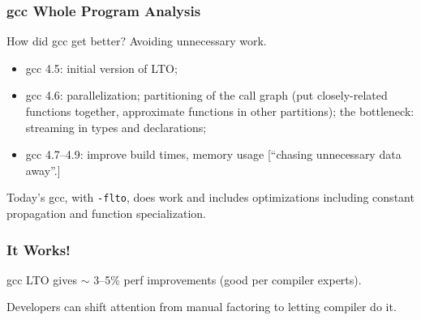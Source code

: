 \begin{frame}
\frametitle{gcc Whole Program Analysis}

{\Large How did gcc get better?  Avoiding unnecessary work. }

\begin{itemize}
\item gcc 4.5: initial version of LTO;
\item gcc 4.6: parallelization; partitioning of the call graph (put closely-related functions together, approximate functions in other partitions); the bottleneck: streaming in types and declarations;
\item gcc 4.7--4.9: improve build times, memory usage [``chasing unnecessary data away''.]
\end{itemize}

Today's gcc, with {\tt -flto}, does work and includes
optimizations including constant propagation and function
specialization.


\end{frame}


\begin{frame}
\frametitle{It Works!}

\Large
\begin{changemargin}{2cm}

gcc LTO gives $\sim$ 3--5\% perf improvements (good per compiler experts).


Developers can shift attention from 
manual factoring to letting compiler do it.
\end{changemargin}
\end{frame}







